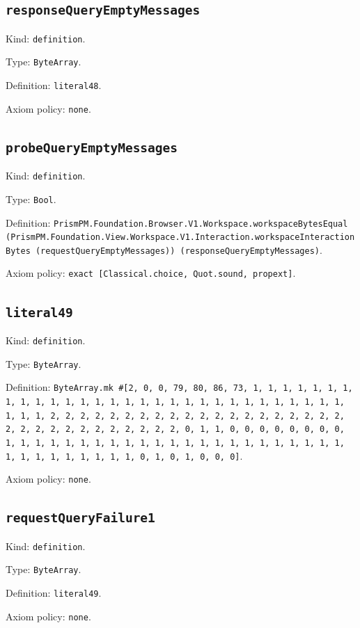 \documentclass[11pt]{article}
\begin{document}
\subsection*{\texttt{responseQueryEmptyMessages}}
\noindent Kind: \texttt{definition}.\par
\noindent Type: \texttt{ByteArray}.\par
\noindent Definition: \texttt{literal48}.\par
\noindent Axiom policy: \texttt{none}.\par
\subsection*{\texttt{probeQueryEmptyMessages}}
\noindent Kind: \texttt{definition}.\par
\noindent Type: \texttt{Bool}.\par
\noindent Definition: \texttt{PrismPM.Foundation.Browser.V1.Workspace.workspaceBytesEqual (PrismPM.Foundation.View.Workspace.V1.Interaction.workspaceInteractionBytes (requestQueryEmptyMessages)) (responseQueryEmptyMessages)}.\par
\noindent Axiom policy: \texttt{exact [Classical.choice, Quot.sound, propext]}.\par
\subsection*{\texttt{literal49}}
\noindent Kind: \texttt{definition}.\par
\noindent Type: \texttt{ByteArray}.\par
\noindent Definition: \texttt{ByteArray.mk \#[2, 0, 0, 79, 80, 86, 73, 1, 1, 1, 1, 1, 1, 1, 1, 1, 1, 1, 1, 1, 1, 1, 1, 1, 1, 1, 1, 1, 1, 1, 1, 1, 1, 1, 1, 1, 1, 1, 1, 1, 2, 2, 2, 2, 2, 2, 2, 2, 2, 2, 2, 2, 2, 2, 2, 2, 2, 2, 2, 2, 2, 2, 2, 2, 2, 2, 2, 2, 2, 2, 2, 2, 0, 1, 1, 0, 0, 0, 0, 0, 0, 0, 0, 1, 1, 1, 1, 1, 1, 1, 1, 1, 1, 1, 1, 1, 1, 1, 1, 1, 1, 1, 1, 1, 1, 1, 1, 1, 1, 1, 1, 1, 1, 1, 1, 0, 1, 0, 1, 0, 0, 0]}.\par
\noindent Axiom policy: \texttt{none}.\par
\subsection*{\texttt{requestQueryFailure1}}
\noindent Kind: \texttt{definition}.\par
\noindent Type: \texttt{ByteArray}.\par
\noindent Definition: \texttt{literal49}.\par
\noindent Axiom policy: \texttt{none}.\par
\end{document}
